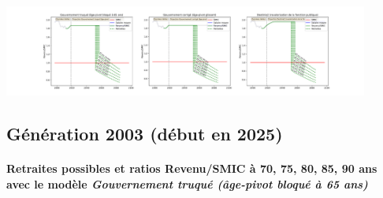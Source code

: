  \begin{center}\includegraphics[width=0.9\textwidth]{fig/SMPT_1990_22_dest_retraite.pdf}\end{center} \label{fig/SMPT_1990_22_dest_retraite.pdf} 

\newpage 
 
\subsection{Génération 2003 (début en 2025)} 

\paragraph{Retraites possibles et ratios Revenu/SMIC à 70, 75, 80, 85, 90 ans avec le modèle \emph{Gouvernement truqué (âge-pivot bloqué à 65 ans)}}  
 
